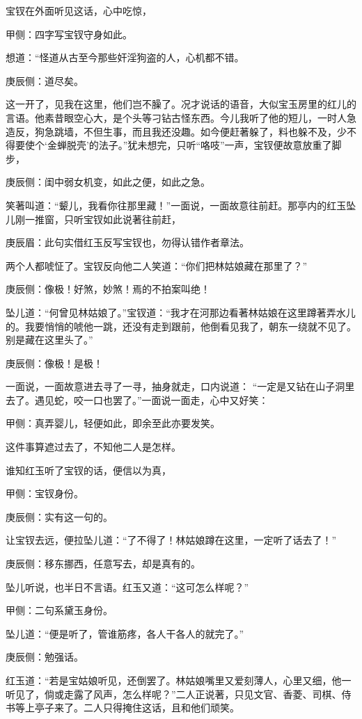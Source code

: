 \begin{parag}
    宝钗在外面听见这话，心中吃惊，\begin{note}甲侧：四字写宝钗守身如此。\end{note}想道：“怪道从古至今那些奸淫狗盗的人，心机都不错。\begin{note}庚辰侧：道尽矣。\end{note}这一开了，见我在这里，他们岂不臊了。况才说话的语音，大似宝玉房里的红儿的言语。他素昔眼空心大，是个头等刁钻古怪东西。今儿我听了他的短儿，一时人急造反，狗急跳墙，不但生事，而且我还没趣。如今便赶著躲了，料也躲不及，少不得要使个‘金蝉脱壳’的法子。”犹未想完，只听“咯吱”一声，宝钗便故意放重了脚步，\begin{note}庚辰侧：闺中弱女机变，如此之便，如此之急。\end{note}笑著叫道：“颦儿，我看你往那里藏！”一面说，一面故意往前赶。那亭内的红玉坠儿刚一推窗，只听宝钗如此说著往前赶，\begin{note}庚辰眉：此句实借红玉反写宝钗也，勿得认错作者章法。\end{note}两个人都唬怔了。宝钗反向他二人笑道：“你们把林姑娘藏在那里了？”\begin{note}庚辰侧：像极！好煞，妙煞！焉的不拍案叫绝！\end{note}坠儿道：“何曾见林姑娘了。”宝钗道：“我才在河那边看著林姑娘在这里蹲著弄水儿的。我要悄悄的唬他一跳，还没有走到跟前，他倒看见我了，朝东一绕就不见了。别是藏在这里头了。”\begin{note}庚辰侧：像极！是极！\end{note}一面说，一面故意进去寻了一寻，抽身就走，口内说道： “一定是又钻在山子洞里去了。遇见蛇，咬一口也罢了。”一面说一面走，心中又好笑：\begin{note}甲侧：真弄婴儿，轻便如此，即余至此亦要发笑。\end{note}这件事算遮过去了，不知他二人是怎样。
\end{parag}


\begin{parag}
    谁知红玉听了宝钗的话，便信以为真，\begin{note}甲侧：宝钗身份。\end{note}\begin{note}庚辰侧：实有这一句的。\end{note}让宝钗去远，便拉坠儿道：“了不得了！林姑娘蹲在这里，一定听了话去了！”\begin{note}庚辰侧：移东挪西，任意写去，却是真有的。\end{note}坠儿听说，也半日不言语。红玉又道：“这可怎么样呢？”\begin{note}甲侧：二句系黛玉身份。\end{note}坠儿道：“便是听了，管谁筋疼，各人干各人的就完了。”\begin{note}庚辰侧：勉强话。\end{note}红玉道：“若是宝姑娘听见，还倒罢了。林姑娘嘴里又爱刻薄人，心里又细，他一听见了，倘或走露了风声，怎么样呢？”二人正说著，只见文官、香菱、司棋、侍书等上亭子来了。二人只得掩住这话，且和他们顽笑。
\end{parag}



